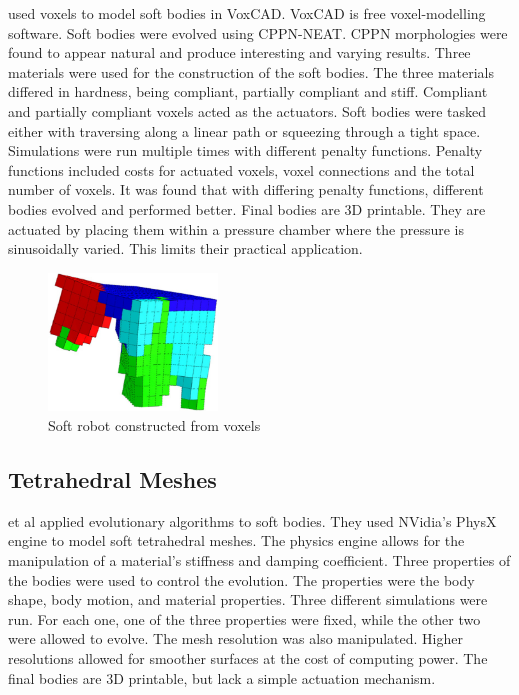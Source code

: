 \cite{Cheney2013} used voxels to model soft bodies in VoxCAD. VoxCAD is free voxel-modelling software. Soft bodies were evolved using CPPN-NEAT. CPPN morphologies were found to appear natural and produce interesting and varying results. Three materials were used for the construction of the soft bodies. The three materials differed in hardness, being compliant, partially compliant and stiff. Compliant and partially compliant voxels acted as the actuators. Soft bodies were tasked either with traversing along a linear path or squeezing through a tight space. Simulations were run multiple times with different penalty functions. Penalty functions included costs for actuated voxels, voxel connections and the total number of voxels. It was found that with differing penalty functions, different bodies evolved and performed better. Final bodies are 3D printable. They are actuated by placing them within a pressure chamber where the pressure is sinusoidally varied. This limits their practical application. \citep{Cheney2013,Cheney2015}

\begin{figure}[H]
	\centering
	\includegraphics[width=0.4\textwidth]{Voxel.png}
	\caption[Soft robot constructed from voxels]{Soft robot constructed from voxels \citep{Cheney2013}}
	\label{fig:vox}
\end{figure}

\subsection{Tetrahedral Meshes}

\cite{Rieffel2013} et al applied evolutionary algorithms to soft bodies. They used NVidia's PhysX engine to model soft tetrahedral meshes. The physics engine allows for the manipulation of a material's stiffness and damping coefficient. Three properties of the bodies were used to control the evolution. The properties were the body shape, body motion, and material properties. Three different simulations were run. For each one, one of the three properties were fixed, while the other two were allowed to evolve. The mesh resolution was also manipulated. Higher resolutions allowed for smoother surfaces at the cost of computing power. The final bodies are 3D printable, but lack a simple actuation mechanism. \citep{Rieffel2013}

